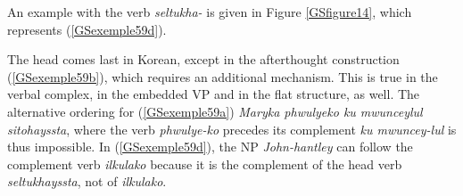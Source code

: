 \documentclass[output=paper]{langsci/langscibook}
\begin{document}
{\begin{exe}
	\label{GSexemple60} 
	\begin{xlist}
	
	     \end{xlist}
\end{exe}

An example with the verb \textit{seltukha-} is given in Figure \ref{GSfigure14}, which represents (\ref{GSexemple59d}).


The head comes last in Korean, except in the afterthought construction (\ref{GSexemple59b}), which requires an additional mechanism. This is true in the verbal complex, in the embedded VP and in the flat structure, as well. The alternative ordering for (\ref{GSexemple59a}) \textit{\*Maryka phwulyeko ku mwunceylul sitohayssta}, where the verb \textit{phwulye-ko} precedes its complement \textit{ku mwuncey-lul} is thus impossible. In (\ref{GSexemple59d}), the NP \textit{John-hantley} can follow the complement verb \textit{ilkulako} because it is the complement of the head verb \textit{seltukhayssta}, not of \textit{ilkulako}.  

}
\end{document}
